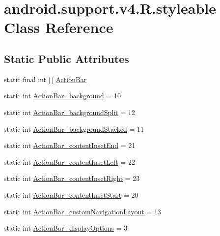 \hypertarget{classandroid_1_1support_1_1v4_1_1R_1_1styleable}{}\section{android.\+support.\+v4.\+R.\+styleable Class Reference}
\label{classandroid_1_1support_1_1v4_1_1R_1_1styleable}
\subsection*{Static Public Attributes}
\begin{DoxyCompactItemize}
\item 
static final int \mbox{[}$\,$\mbox{]} \hyperlink{classandroid_1_1support_1_1v4_1_1R_1_1styleable_adc5a3492b9c46265760d7120a04d6afa}{Action\+Bar}
\item 
static int \hyperlink{classandroid_1_1support_1_1v4_1_1R_1_1styleable_a94adf52e3aef74eee3f46cc8699d6d08}{Action\+Bar\+\_\+background} = 10
\item 
static int \hyperlink{classandroid_1_1support_1_1v4_1_1R_1_1styleable_a13fc4682aff98cabdb455b8d50537f59}{Action\+Bar\+\_\+background\+Split} = 12
\item 
static int \hyperlink{classandroid_1_1support_1_1v4_1_1R_1_1styleable_aacf7d90f6edcba30a3c2043eec5cef02}{Action\+Bar\+\_\+background\+Stacked} = 11
\item 
static int \hyperlink{classandroid_1_1support_1_1v4_1_1R_1_1styleable_a8c18998b9778b47903b01c995bc228dd}{Action\+Bar\+\_\+content\+Inset\+End} = 21
\item 
static int \hyperlink{classandroid_1_1support_1_1v4_1_1R_1_1styleable_acb50a5936c9ea41ae3f8e43860a37a11}{Action\+Bar\+\_\+content\+Inset\+Left} = 22
\item 
static int \hyperlink{classandroid_1_1support_1_1v4_1_1R_1_1styleable_a3bef2a0708d9a976e79efa23e5327187}{Action\+Bar\+\_\+content\+Inset\+Right} = 23
\item 
static int \hyperlink{classandroid_1_1support_1_1v4_1_1R_1_1styleable_a8c36e247399bd81da6f4808194dd4df8}{Action\+Bar\+\_\+content\+Inset\+Start} = 20
\item 
static int \hyperlink{classandroid_1_1support_1_1v4_1_1R_1_1styleable_a1ea53c5c11ad0d5f6a9a592da14f2b64}{Action\+Bar\+\_\+custom\+Navigation\+Layout} = 13
\item 
static int \hyperlink{classandroid_1_1support_1_1v4_1_1R_1_1styleable_a777891bdb003968579bc757b1781ca24}{Action\+Bar\+\_\+display\+Options} = 3

\end{DoxyCompactItemize}
